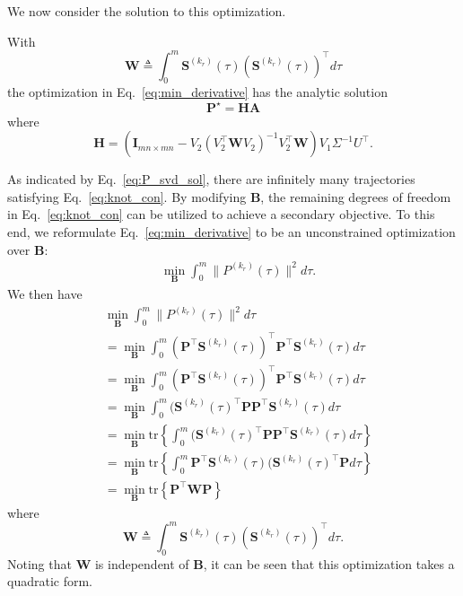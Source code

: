 We now consider the solution to this optimization.
\begin{theorem}
	With 
	\begin{equation}
		\mathbf{W} \triangleq \int_0^m \mathbf{S}^{(k_r)}(\tau) (\mathbf{S}^{(k_r)} (\tau))^\top d\tau
	\end{equation}
	the optimization in Eq.~\ref{eq:min_derivative} has the analytic solution
	\begin{equation}
		\mathbf{P}^\star = \mathbf{H} \mathbf{A}
	\end{equation}
	where
	\begin{equation}
		 \mathbf{H}  = (\mathbf{I}_{mn \times mn} - V_2(V_2^\top \mathbf{W} V_2)^{-1} V_2^\top \mathbf{W})V_1 \Sigma^{-1} U^\top.
	\end{equation}
\end{theorem}
\proof
	As indicated by Eq.~\ref{eq:P_svd_sol}, there are infinitely many trajectories satisfying Eq.~\ref{eq:knot_con}.
	By modifying $\mathbf{B}$, the remaining degrees of freedom in Eq.~\ref{eq:knot_con} can be utilized to achieve a secondary objective. 
	To this end, we reformulate Eq.~\ref{eq:min_derivative} to be an unconstrained optimization over $\mathbf{B}$:
	\begin{equation}
		\label{eq:min_derivative_uncon}
		\begin{aligned}
		&\min_{\mathbf{B}} \int_{0}^m \|P^{(k_r)}(\tau)\|^2 d\tau. 
		\end{aligned}
	\end{equation}
	We then have
	\begin{align}
		&\min_{\mathbf{B}} \int_{0}^m \|P^{(k_r)}(\tau)\|^2 d\tau \\
		&= \min_{\mathbf{B}} \int_{0}^m (\mathbf{P}^\top \mathbf{S}^{(k_r)}(\tau))^\top \mathbf{P}^\top \mathbf{S}^{(k_r)}(\tau)  d\tau \\
		&= \min_{\mathbf{B}} \int_{0}^m (\mathbf{P}^\top \mathbf{S}^{(k_r)}(\tau))^\top \mathbf{P}^\top \mathbf{S}^{(k_r)}(\tau)  d\tau \\
		&= \min_{\mathbf{B}} \int_{0}^m  (\mathbf{S}^{(k_r)}(\tau)^\top \mathbf{P} \mathbf{P}^\top \mathbf{S}^{(k_r)}(\tau)  d\tau \\
		&= \min_{\mathbf{B}} \mathrm{tr} \left\{ \int_{0}^m  (\mathbf{S}^{(k_r)}(\tau)^\top \mathbf{P} \mathbf{P}^\top \mathbf{S}^{(k_r)}(\tau)  d\tau \right\} \\
		&= \min_{\mathbf{B}} \mathrm{tr} \left\{ \int_{0}^m \mathbf{P}^\top \mathbf{S}^{(k_r)}(\tau)  (\mathbf{S}^{(k_r)}(\tau)^\top \mathbf{P}  d\tau \right\} \\
		&= \min_{\mathbf{B}} \mathrm{tr} \left\{ \mathbf{P}^\top \mathbf{W} \mathbf{P}  \right\}
	\end{align}
	where
	\begin{equation}
		\mathbf{W} \triangleq \int_0^m \mathbf{S}^{(k_r)}(\tau) (\mathbf{S}^{(k_r)} (\tau))^\top d\tau. 
	\end{equation}
	Noting that $\mathbf{W}$ is independent of $\mathbf{B}$, it can be seen that this optimization takes a quadratic form.

